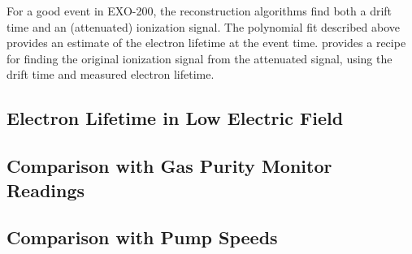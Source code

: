 \documentclass[herrin-thesis.tex]{subfiles}
\begin{document}
For a good event in EXO-200, the reconstruction algorithms find both a drift time and an (attenuated) ionization signal. The polynomial fit described above provides an estimate of the electron lifetime at the event time.  provides a recipe for finding the original ionization signal from the attenuated signal, using the drift time and measured electron lifetime.

\subsection{Electron Lifetime in Low Electric Field}

\subsection{Comparison with Gas Purity Monitor Readings}

\subsection{Comparison with Pump Speeds}
\end{document}
